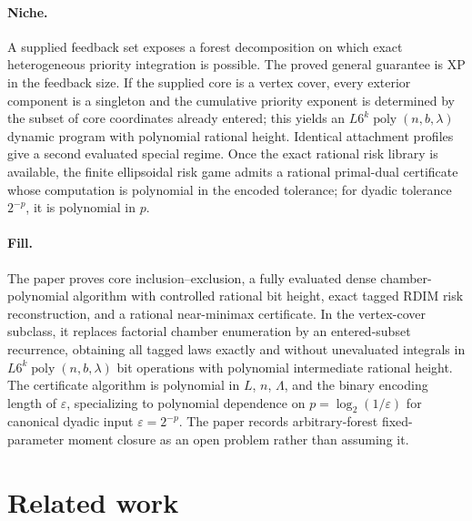 \documentclass{article}
\begin{document}
\paragraph{Niche.} A supplied feedback set exposes a forest decomposition on which exact heterogeneous priority integration is possible. The proved general guarantee is XP in the feedback size. If the supplied core is a vertex cover, every exterior component is a singleton and the cumulative priority exponent is determined by the subset of core coordinates already entered; this yields an \(L6^k\operatorname{poly}(n,b,\lambda)\) dynamic program with polynomial rational height. Identical attachment profiles give a second evaluated special regime. Once the exact rational risk library is available, the finite ellipsoidal risk game admits a rational primal-dual certificate whose computation is polynomial in the encoded tolerance; for dyadic tolerance \(2^{-p}\), it is polynomial in \(p\).

\paragraph{Fill.} The paper proves core inclusion--exclusion, a fully evaluated dense chamber-polynomial algorithm with controlled rational bit height, exact tagged RDIM risk reconstruction, and a rational near-minimax certificate. In the vertex-cover subclass, it replaces factorial chamber enumeration by an entered-subset recurrence, obtaining all tagged laws exactly and without unevaluated integrals in \(L6^k\operatorname{poly}(n,b,\lambda)\) bit operations with polynomial intermediate rational height. The certificate algorithm is polynomial in \(L\), \(n\), \(\Lambda\), and the binary encoding length of \(\varepsilon\), specializing to polynomial dependence on \(p=\log_2(1/\varepsilon)\) for canonical dyadic input \(\varepsilon=2^{-p}\). The paper records arbitrary-forest fixed-parameter moment closure as an open problem rather than assuming it.

\section{Related work}
\end{document}
